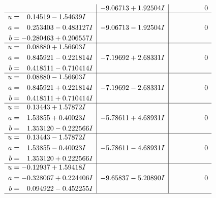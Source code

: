 \documentclass[1p]{elsarticle_modified}
\theoremstyle{definition}
\begin{document}
$$\begin{array}{c|c|c}
 & -9.06713 + 1.92504 I & \phantom{-0.000000 } 0 \\ \hline\begin{aligned}
u &= \phantom{-}0.14519 - 1.54639 I \\
a &= \phantom{-}0.253403 - 0.483127 I \\
b &= -0.280463 + 0.206557 I\end{aligned}
 & -9.06713 - 1.92504 I & \phantom{-0.000000 } 0 \\ \hline\begin{aligned}
u &= \phantom{-}0.08880 + 1.56603 I \\
a &= \phantom{-}0.845921 - 0.221814 I \\
b &= \phantom{-}0.418511 - 0.710414 I\end{aligned}
 & -7.19692 + 2.68331 I & \phantom{-0.000000 } 0 \\ \hline\begin{aligned}
u &= \phantom{-}0.08880 - 1.56603 I \\
a &= \phantom{-}0.845921 + 0.221814 I \\
b &= \phantom{-}0.418511 + 0.710414 I\end{aligned}
 & -7.19692 - 2.68331 I & \phantom{-0.000000 } 0 \\ \hline\begin{aligned}
u &= \phantom{-}0.13443 + 1.57872 I \\
a &= \phantom{-}1.53855 + 0.40023 I \\
b &= \phantom{-}1.353120 - 0.222566 I\end{aligned}
 & -5.78611 + 4.68931 I & \phantom{-0.000000 } 0 \\ \hline\begin{aligned}
u &= \phantom{-}0.13443 - 1.57872 I \\
a &= \phantom{-}1.53855 - 0.40023 I \\
b &= \phantom{-}1.353120 + 0.222566 I\end{aligned}
 & -5.78611 - 4.68931 I & \phantom{-0.000000 } 0 \\ \hline\begin{aligned}
u &= -0.12937 + 1.59418 I \\
a &= -0.328067 + 0.224406 I \\
b &= \phantom{-}0.094922 - 0.452255 I\end{aligned}
 & -9.65837 - 5.20890 I & \phantom{-0.000000 } 0\\
 \hline 
 \end{array}$$\newpage$$\begin{array}{c|c|c}  

\end{array}$$
\end{document}
